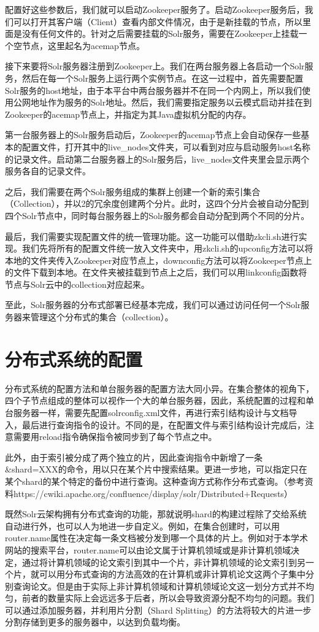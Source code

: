 配置好这些参数后，我们就可以启动Zookeeper服务了。启动Zookeeper服务后，我们可以打开其客户端（Client）查看内部文件情况，由于是新挂载的节点，所以里面是没有任何文件的。针对之后需要挂载的Solr服务，需要在Zookeeper上挂载一个空节点，这里起名为acemap节点。

接下来要将Solr服务器注册到Zookeeper上。我们在两台服务器上各启动一个Solr服务，然后在每一个Solr服务上运行两个实例节点。在这一过程中，首先需要配置Solr服务的host地址，由于本平台中两台服务器并不在同一个内网上，所以我们使用公网地址作为服务的Solr地址。然后，我们需要指定服务以云模式启动并挂在到Zookeeper的acemap节点上，并指定为其Java虚拟机分配的内存。

第一台服务器上的Solr服务启动后，Zookeeper的acemap节点上会自动保存一些基本的配置文件，打开其中的live\_nodes文件夹，可以看到对应与启动服务host名称的记录文件。启动第二台服务器上的Solr服务后，live\_nodes文件夹里会显示两个服务各自的记录文件。

之后，我们需要在两个Solr服务组成的集群上创建一个新的索引集合（Collection），并以2的冗余度创建两个分片。此时，这四个分片会被自动分配到四个Solr节点中，同时每台服务器上的Solr服务都会自动分配到两个不同的分片。

最后，我们需要实现配置文件的统一管理功能。这一功能可以借助zkcli.sh进行实现。我们先将所有的配置文件统一放入文件夹中，用zkcli.sh的upconfig方法可以将本地的文件夹传入Zookeeper对应节点上，downconfig方法可以将Zookeeper节点上的文件下载到本地。在文件夹被挂载到节点上之后，我们可以用linkconfig函数将节点与Solr云中的collection对应起来。

至此，Solr服务器的分布式部署已经基本完成，我们可以通过访问任何一个Solr服务器来管理这个分布式的集合（collection）。

\section{分布式系统的配置}
分布式系统的配置方法和单台服务器的配置方法大同小异。在集合整体的视角下，四个子节点组成的整体可以视作一个大的单台服务器，因此，系统配置的过程和单台服务器一样，需要先配置solrconfig.xml文件，再进行索引结构设计与文档导入，最后进行查询指令的设计。不同的是，在配置文件与索引结构设计完成后，注意需要用reload指令确保指令被同步到了每个节点之中。

此外，由于索引被分成了两个独立的片，因此查询指令中新增了一条\&shard=XXX的命令，用以只在某个片中搜索结果。更进一步地，可以指定只在某个shard的某个特定的备份中进行查询。这种查询方式称作分布式查询。（参考资料https://cwiki.apache.org/confluence/display/solr/Distributed+Requests）

既然Solr云架构拥有分布式查询的功能，那就说明shard的构建过程除了交给系统自动进行外，也可以人为地进一步自定义。例如，在集合创建时，可以用router.name属性在决定每一条文档被分发到哪一个具体的片上。例如对于本学术网站的搜索平台，router.name可以由论文属于计算机领域或是非计算机领域决定，通过将计算机领域的论文索引到其中一个片，非计算机领域的论文索引到另一个片，就可以用分布式查询的方法高效的在计算机或非计算机论文这两个子集中分别查询论文。但是由于实际上非计算机领域和计算机领域论文这一划分方式并不均匀，前者的数量实际上会远远多于后者，所以会导致资源分配不均匀的问题。我们可以通过添加服务器，并利用片分割（Shard Splitting）的方法将较大的片进一步分割存储到更多的服务器中，以达到负载均衡。